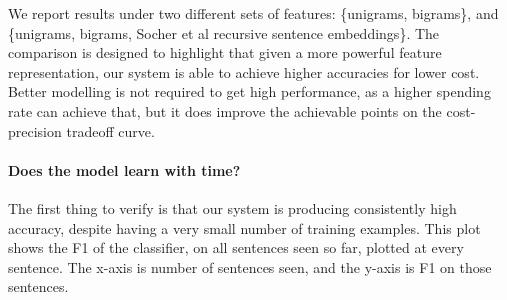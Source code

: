 %
%


We report results under two different sets of features: \{unigrams, bigrams\}, and \{unigrams, bigrams, Socher et al recursive sentence embeddings\}. The comparison is designed to highlight that given a more powerful feature representation, our system is able to achieve higher accuracies for lower cost. Better modelling is not required to get high performance, as a higher spending rate can achieve that, but it does improve the achievable points on the cost-precision tradeoff curve.


\paragraph{Does the model learn with time?} 
The first thing to verify is that our system is producing consistently high accuracy, despite having a very small number of
training examples. This plot shows the F1 of the classifier, on all sentences seen 
so far, plotted at every sentence.
The x-axis is number of sentences seen, and the y-axis is F1 on those sentences.

